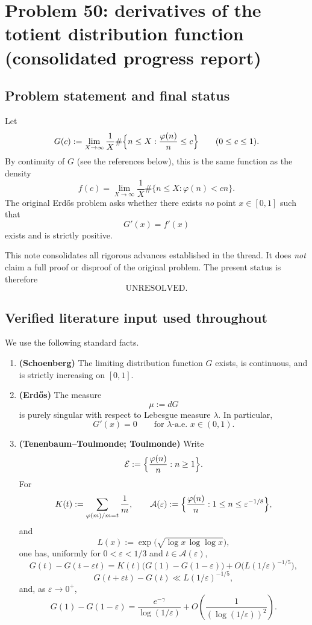 
\section{Problem 50: derivatives of the totient distribution function (consolidated progress report)}

\subsection{Problem statement and final status}

Let
\[
G(c):=\lim_{X\to\infty}\frac1X\#\Bigl\{n\le X:\frac{\varphi(n)}n\le c\Bigr\}
\qquad(0\le c\le 1).
\]
By continuity of $G$ (see the references below), this is the same function as the density
\[
 f(c)=\lim_{X\to\infty}\frac1X\#\{n\le X:\varphi(n)<cn\}.
\]
The original Erd\H{o}s problem asks whether there exists \emph{no} point $x\in[0,1]$ such that
\[
G'(x)=f'(x)
\]
exists and is strictly positive.

This note consolidates all rigorous advances established in the thread. It does \emph{not} claim a full proof or disproof of the original problem. The present status is therefore
\[
\boxed{\text{UNRESOLVED}}.
\]

\subsection{Verified literature input used throughout}

We use the following standard facts.

\begin{enumerate}
\item \textbf{(Schoenberg)} The limiting distribution function $G$ exists, is continuous, and is strictly increasing on $[0,1]$.

\item \textbf{(Erd\H{o}s)} The measure
\[
\mu:=dG
\]
is purely singular with respect to Lebesgue measure $\lambda$. In particular,
\[
G'(x)=0\qquad\text{for }\lambda\text{-a.e. }x\in(0,1).
\]

\item \textbf{(Tenenbaum--Toulmonde; Toulmonde)} Write
\[
\mathcal E:=\Bigl\{\frac{\varphi(n)}n:n\ge1\Bigr\}.
\]
For
\[
K(t):=\sum_{\varphi(m)/m=t}\frac1m,
\qquad
\mathcal A(\varepsilon):=\Bigl\{\frac{\varphi(n)}n:1\le n\le \varepsilon^{-1/8}\Bigr\},
\]
and
\[
L(x):=\exp\!\bigl(\sqrt{\log x\,\log\log x}\bigr),
\]
one has, uniformly for $0<\varepsilon<1/3$ and $t\in\mathcal A(\varepsilon)$,
\[
G(t)-G(t-\varepsilon t)=K(t)\bigl(G(1)-G(1-\varepsilon)\bigr)+O\bigl(L(1/\varepsilon)^{-1/5}\bigr),
\]
\[
G(t+\varepsilon t)-G(t)\ll L(1/\varepsilon)^{-1/5},
\]
and, as $\varepsilon\to0^+$,
\[
G(1)-G(1-\varepsilon)=\frac{e^{-\gamma}}{\log(1/\varepsilon)}+O\!\left(\frac1{(\log(1/\varepsilon))^2}\right).
\]
\end{enumerate}

